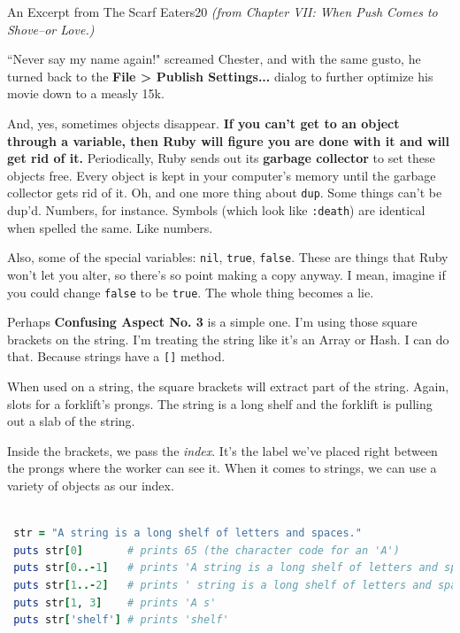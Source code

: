\documentclass[10pt,twoside]{report}
\begin{document}
	\begin{sidebar}{An Excerpt from The Scarf Eaters}{20}
		\textit{(from Chapter VII: When Push Comes to Shove--or Love.)}\vspace{6pt}
		
		``Never say my name again!" screamed Chester, and with the same gusto, he turned back to the \textbf{File > Publish Settings...} dialog to further optimize his movie down to a measly 15k.
	\end{sidebar}

And, yes, sometimes objects disappear.  {\bf If you can't get to an
  object through a variable, then Ruby will figure you are done with
  it and will get rid of it.}  Periodically, Ruby sends out its {\bf
  garbage collector} to set these objects free.  Every object is kept
in your computer's memory until the garbage collector gets rid of it.
Oh, and one more thing about \lstinline[breaklines=true]|dup|.  Some
things can't be dup'd.  Numbers, for instance.  Symbols (which look
like \lstinline[breaklines=true]|:death|) are identical when spelled
the same.  Like numbers.

Also, some of the special variables: \lstinline[breaklines=true]|nil|,
\lstinline[breaklines=true]|true|, \lstinline[breaklines=true]|false|.
These are things that Ruby won't let you alter, so there's so point
making a copy anyway.  I mean, imagine if you could change
\lstinline[breaklines=true]|false| to be
\lstinline[breaklines=true]|true|.  The whole thing becomes a lie.

Perhaps {\bf Confusing Aspect No. 3} is a simple one.  I'm using those
square brackets on the string.  I'm treating the string like it's an
Array or Hash.  I can do that.  Because strings have a
\lstinline[breaklines=true]|[]| method.

When used on a string, the square brackets will extract part of the
string.  Again, slots for a forklift's prongs.  The string is a long
shelf and the forklift is pulling out a slab of the string.

Inside the brackets, we pass the {\em index}.  It's the label we've
placed right between the prongs where the worker can see it.  When it
comes to strings, we can use a variety of objects as our index.


\begin{lstlisting}[basicstyle=\ttfamily\color{basiccolor},
    commentstyle = \ttfamily\color{commentcolor},
    keywordstyle=\ttfamily\color{keywordscolor},
    stringstyle=\color{stringcolor},
    language=Ruby,
    basicstyle=\small\ttfamily,
    showstringspaces=false,
  ]

 str = "A string is a long shelf of letters and spaces."
 puts str[0]       # prints 65 (the character code for an 'A')
 puts str[0..-1]   # prints 'A string is a long shelf of letters and spaces.'
 puts str[1..-2]   # prints ' string is a long shelf of letters and spaces'
 puts str[1, 3]    # prints 'A s'
 puts str['shelf'] # prints 'shelf'

\end{lstlisting}
\end{document}
